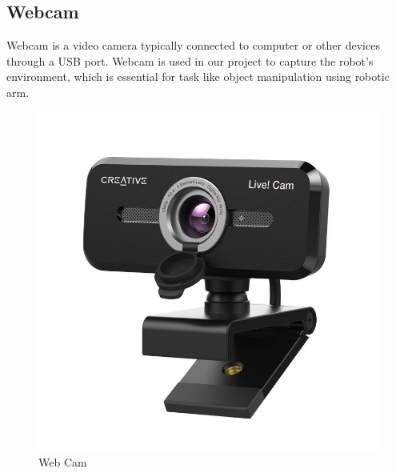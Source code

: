   \subsection{Webcam}
  Webcam is a video camera typically connected to computer or other devices through a USB port. Webcam is used in our project to capture the robot's environment, which is essential for task like object manipulation using robotic arm. 
    \begin{figure}[h]
    \centering
    \includegraphics[width=1\linewidth]{Graphics/webcam.jpg}
    \caption{Web Cam}
    \label{fig:enter-label}
\end{figure}
  

